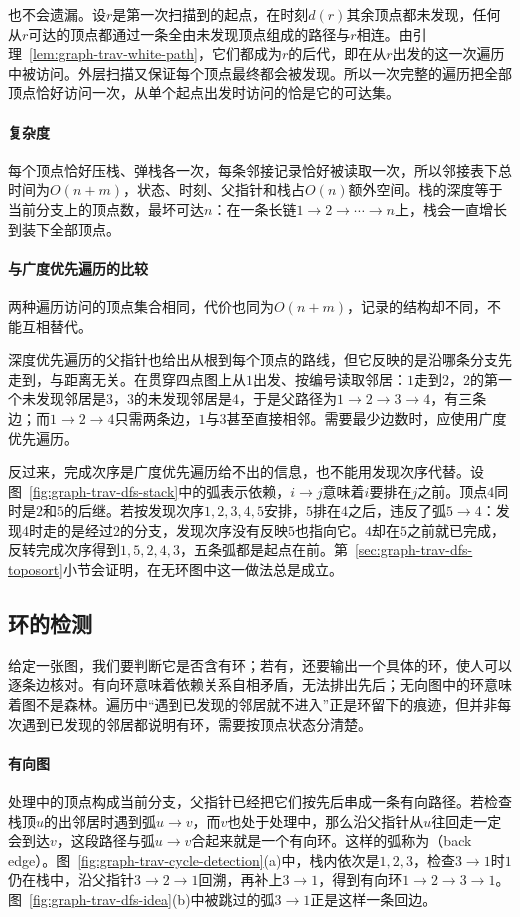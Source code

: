 也不会遗漏。设$r$是第一次扫描到的起点，在时刻$d(r)$其余顶点都未发现，任何从$r$可达的顶点都通过一条全由未发现顶点组成的路径与$r$相连。由引理~\ref{lem:graph-trav-white-path}，它们都成为$r$的后代，即在从$r$出发的这一次遍历中被访问。外层扫描又保证每个顶点最终都会被发现。所以一次完整的遍历把全部顶点恰好访问一次，从单个起点出发时访问的恰是它的可达集。

\paragraph{复杂度}
每个顶点恰好压栈、弹栈各一次，每条邻接记录恰好被读取一次，所以邻接表下总时间为$O(n+m)$，状态、时刻、父指针和栈占$O(n)$额外空间。栈的深度等于当前分支上的顶点数，最坏可达$n$：在一条长链$1\to2\to\cdots\to n$上，栈会一直增长到装下全部顶点。

\paragraph{与广度优先遍历的比较}
两种遍历访问的顶点集合相同，代价也同为$O(n+m)$，记录的结构却不同，不能互相替代。

深度优先遍历的父指针也给出从根到每个顶点的路线，但它反映的是沿哪条分支先走到，与距离无关。在贯穿四点图上从$1$出发、按编号读取邻居：$1$走到$2$，$2$的第一个未发现邻居是$3$，$3$的未发现邻居是$4$，于是父路径为$1\to2\to3\to4$，有三条边；而$1\to2\to4$只需两条边，$1$与$3$甚至直接相邻。需要最少边数时，应使用广度优先遍历。

反过来，完成次序是广度优先遍历给不出的信息，也不能用发现次序代替。设图~\ref{fig:graph-trav-dfs-stack}中的弧表示依赖，$i\to j$意味着$i$要排在$j$之前。顶点$4$同时是$2$和$5$的后继。若按发现次序$1,2,3,4,5$安排，$5$排在$4$之后，违反了弧$5\to4$：发现$4$时走的是经过$2$的分支，发现次序没有反映$5$也指向它。$4$却在$5$之前就已完成，反转完成次序得到$1,5,2,4,3$，五条弧都是起点在前。第~\ref{sec:graph-trav-dfs-toposort}小节会证明，在无环图中这一做法总是成立。

\subsection{环的检测}
\label{sec:graph-trav-cycle-detection}

给定一张图，我们要判断它是否含有环；若有，还要输出一个具体的环，使人可以逐条边核对。有向环意味着依赖关系自相矛盾，无法排出先后；无向图中的环意味着图不是森林。遍历中“遇到已发现的邻居就不进入”正是环留下的痕迹，但并非每次遇到已发现的邻居都说明有环，需要按顶点状态分清楚。

\paragraph{有向图}
处理中的顶点构成当前分支，父指针已经把它们按先后串成一条有向路径。若检查栈顶$u$的出邻居时遇到弧$u\to v$，而$v$也处于处理中，那么沿父指针从$u$往回走一定会到达$v$，这段路径与弧$u\to v$合起来就是一个有向环。这样的弧称为（back edge）。图~\ref{fig:graph-trav-cycle-detection}(a)中，栈内依次是$1,2,3$，检查$3\to1$时$1$仍在栈中，沿父指针$3\to2\to1$回溯，再补上$3\to1$，得到有向环$1\to2\to3\to1$。图~\ref{fig:graph-trav-dfs-idea}(b)中被跳过的弧$3\to1$正是这样一条回边。


